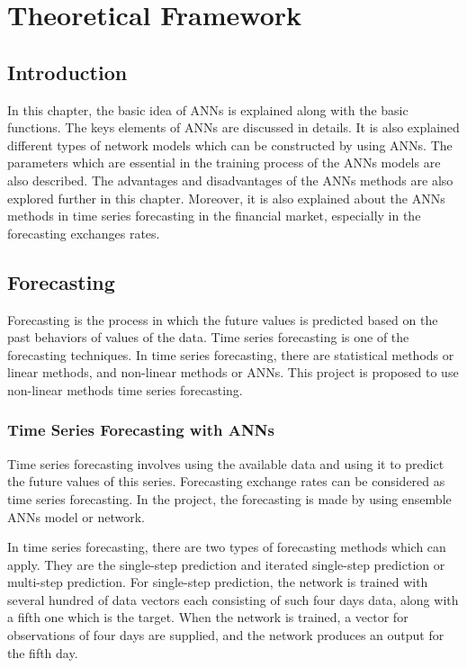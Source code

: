 \chapter{Theoretical Framework}
\section{Introduction}
In this chapter, the basic idea of ANNs is explained along with the basic functions. The keys elements of ANNs are discussed in details. It is also explained different types of network models which can be constructed by using ANNs. The parameters which are essential in the training process of the ANNs models are also described. The advantages and disadvantages of the ANNs methods are also explored further in this chapter. Moreover, it is also explained about the ANNs methods in time series forecasting in the financial market, especially in the forecasting exchanges rates. 

\section{Forecasting}
Forecasting is the process in which the future values is predicted based on the past behaviors of values of the data. Time series forecasting is one of the forecasting techniques. In time series forecasting, there are statistical methods or linear methods, and non-linear methods or ANNs. This project is proposed to use non-linear methods  time series forecasting.
\subsection{Time Series Forecasting with ANNs}

Time series forecasting involves using the available data and using it to predict the future values of this series. Forecasting exchange rates can be considered as time series forecasting. In the project,  the forecasting  is made by using ensemble ANNs model or network.

In time series forecasting, there are two types of forecasting methods which can apply. They are the single-step prediction and iterated single-step prediction or  multi-step prediction. For single-step prediction, the network is trained with several hundred of data vectors each consisting of such four days data, along with a fifth one which is the target. When the network is trained, a vector for observations of four days are supplied, and the network produces an output for the fifth day. 


